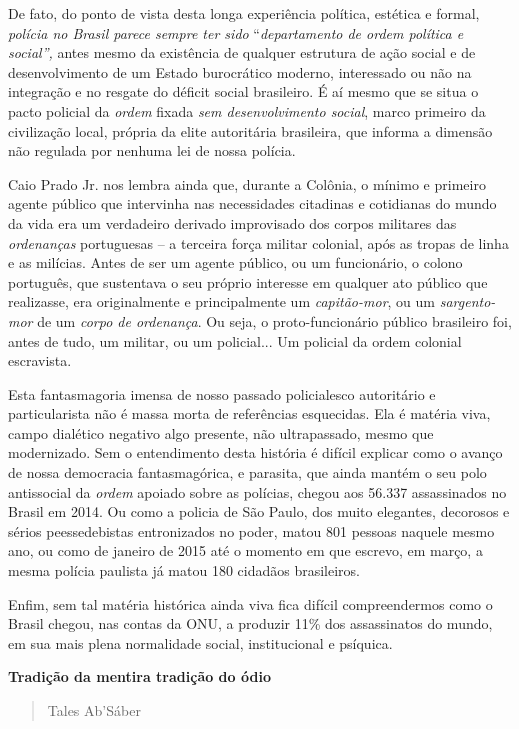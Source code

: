 De fato, do ponto de vista desta longa experiência política, estética e
formal, \emph{polícia no Brasil parece sempre ter sido}
``\emph{departamento de ordem política e social'',} antes mesmo da
existência de qualquer estrutura de ação social e de desenvolvimento de
um Estado burocrático moderno, interessado ou não na integração e no
resgate do déficit social brasileiro. É aí mesmo que se situa o pacto
policial da \emph{ordem} fixada \emph{sem desenvolvimento social}, marco
primeiro da civilização local, própria da elite autoritária brasileira,
que informa a dimensão não regulada por nenhuma lei de nossa polícia.

Caio Prado Jr. nos lembra ainda que, durante a Colônia, o mínimo e
primeiro agente público que intervinha nas necessidades citadinas e
cotidianas do mundo da vida era um verdadeiro derivado improvisado dos
corpos militares das \emph{ordenanças} portuguesas -- a terceira força
militar colonial, após as tropas de linha e as milícias. Antes de ser um
agente público, ou um funcionário, o colono português, que sustentava o
seu próprio interesse em qualquer ato público que realizasse, era
originalmente e principalmente um \emph{capitão-mor}, ou um
\emph{sargento-mor} de um \emph{corpo de ordenança}. Ou seja, o
proto-funcionário público brasileiro foi, antes de tudo, um militar, ou
um policial... Um policial da ordem colonial escravista.

Esta fantasmagoria imensa de nosso passado policialesco autoritário e
particularista não é massa morta de referências esquecidas. Ela é
matéria viva, campo dialético negativo algo presente, não ultrapassado,
mesmo que modernizado. Sem o entendimento desta história é difícil
explicar como o avanço de nossa democracia fantasmagórica, e parasita,
que ainda mantém o seu polo antissocial da \emph{ordem} apoiado sobre as
polícias, chegou aos 56.337 assassinados no Brasil em 2014. Ou como a
policia de São Paulo, dos muito elegantes, decorosos e sérios
peessedebistas entronizados no poder, matou 801 pessoas naquele mesmo
ano, ou como de janeiro de 2015 até o momento em que escrevo, em março,
a mesma polícia paulista já matou 180 cidadãos brasileiros.

Enfim, sem tal matéria histórica ainda viva fica difícil compreendermos
como o Brasil chegou, nas contas da ONU, a produzir 11\% dos
assassinatos do mundo, em sua mais plena normalidade social,
institucional e psíquica.

\textbf{Tradição da mentira tradição do ódio}

\begin{quote}
Tales Ab'Sáber
\end{quote}

